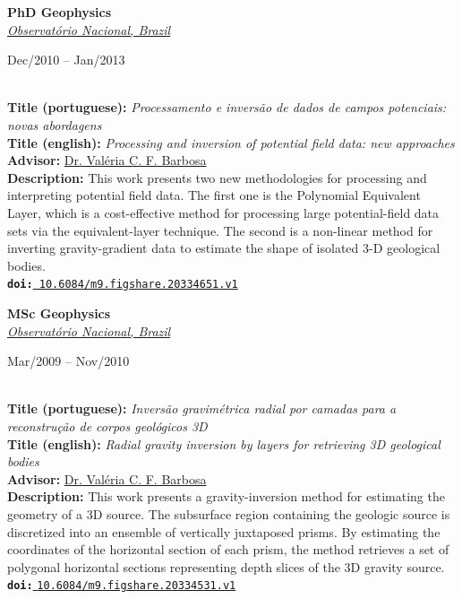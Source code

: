 \documentclass[11pt,a4paper,onecolumn]{article}
\begin{document}
\noindent \textbf{\Large PhD Geophysics} \\
\noindent \href{https://www.gov.br/observatorio/pt-br}{\textsl{Observat\'{o}rio Nacional, Brazil}} \hfill \parbox{0.25\textwidth}{\raggedleft Dec/2010 -- Jan/2013} \vspace{0.3\baselineskip} \\
\noindent \textbf{Title (portuguese):} \textit{Processamento e invers\~{a}o de dados de campos potenciais: novas abordagens} \\
\noindent \textbf{Title (english):} \textit{Processing and inversion of potential field data: new approaches} \\
\noindent \textbf{Advisor:} \href{https://orcid.org/0000-0002-9767-6044}{Dr. Val{\'e}ria C. F. Barbosa} \\
\noindent \textbf{Description:} This work presents two new methodologies for processing and interpreting potential field data. The first one is the Polynomial Equivalent Layer, which is a cost-effective method for processing large potential-field data sets via the equivalent-layer technique. The second is a non-linear method for inverting gravity-gradient data to estimate the shape of isolated 3-D geological bodies. \\
\noindent \texttt{\textbf{doi:}}\href{https://doi.org/10.6084/m9.figshare.20334651.v1}{\texttt{ 10.6084/m9.figshare.20334651.v1}} \\

\medskip

\noindent \textbf{\Large MSc Geophysics} \\
\noindent \href{https://www.gov.br/observatorio/pt-br}{\textsl{Observat\'{o}rio Nacional, Brazil}} \hfill \parbox{0.25\textwidth}{\raggedleft Mar/2009 -- Nov/2010} \vspace{0.3\baselineskip} \\
\noindent \textbf{Title (portuguese):} \textit{Invers\~{a}o gravim\'{e}trica radial por camadas para a reconstru\c{c}\~{a}o de corpos geol\'{o}gicos 3D} \\
\noindent \textbf{Title (english):} \textit{Radial gravity inversion by layers for retrieving 3D geological bodies} \\
\noindent \textbf{Advisor:} \href{https://orcid.org/0000-0002-9767-6044}{Dr. Val{\'e}ria C. F. Barbosa} \\
\noindent \textbf{Description:} This work presents a gravity-inversion method for estimating the geometry of a 3D source. The subsurface region containing the geologic source is discretized into an ensemble of vertically juxtaposed prisms. By estimating the coordinates of the horizontal section of each prism, the method retrieves a set of polygonal horizontal sections representing depth slices of the 3D gravity source. \\
\noindent \texttt{\textbf{doi:}}\href{https://doi.org/10.6084/m9.figshare.20334531.v1}{ \texttt{10.6084/m9.figshare.20334531.v1}} \\
\end{document}
